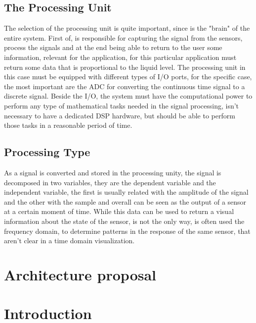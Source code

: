 \subsection*{The Processing Unit}
The selection of the processing unit is quite important, since is the "brain" of the entire system. First of, is responsible for capturing the signal from the sensors, process the signals and at the end being able to return to the user some information, relevant for the application, for this particular application must return some data that is proportional to the liquid level. The processing unit in this case must be equipped with different types of I/O ports, for the specific case, the most important are the ADC for converting the continuous time signal to a discrete signal. Beside the I/O, the system must have the computational power to perform any type of mathematical tasks needed in the signal processing, isn't necessary to have a dedicated DSP hardware, but should be able to perform those tasks in a reasonable period of time.  
\subsection*{Processing Type}
As a signal is converted and stored in the processing unity, the signal is decomposed in two variables, they are the dependent variable and the independent variable, the first is usually related with the amplitude of the signal and the other with the sample and overall can be seen as the output of a sensor at a certain moment of time. While this data can be used to return a visual information about the state of the sensor, is not the only way, is often used the frequency domain, to determine patterns in the response of the same sensor, that aren't clear in a time domain visualization.

\section{Architecture proposal}




\section{Introduction}

